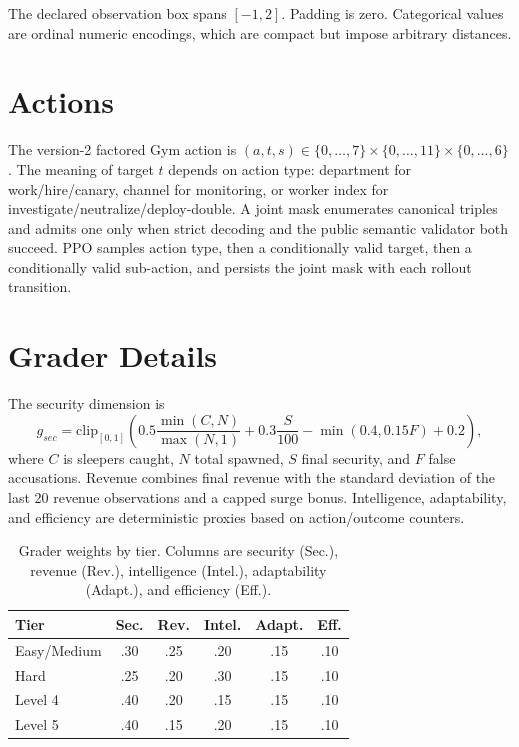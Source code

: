 The declared observation box spans $[-1,2]$. Padding is zero. Categorical values are ordinal numeric encodings, which are compact but impose arbitrary distances.

\section{Actions}

The version-2 factored Gym action is $(a,t,s) \in \{0,\ldots,7\}\times\{0,\ldots,11\}\times\{0,\ldots,6\}$. The meaning of target $t$ depends on action type: department for work/hire/canary, channel for monitoring, or worker index for investigate/neutralize/deploy-double. A joint mask enumerates canonical triples and admits one only when strict decoding and the public semantic validator both succeed. PPO samples action type, then a conditionally valid target, then a conditionally valid sub-action, and persists the joint mask with each rollout transition.

\section{Grader Details}

The security dimension is
\[
g_{sec}=\mathrm{clip}_{[0,1]}\left(0.5\frac{\min(C,N)}{\max(N,1)}+0.3\frac{S}{100}-\min(0.4,0.15F)+0.2\right),
\]
where $C$ is sleepers caught, $N$ total spawned, $S$ final security, and $F$ false accusations. Revenue combines final revenue with the standard deviation of the last 20 revenue observations and a capped surge bonus. Intelligence, adaptability, and efficiency are deterministic proxies based on action/outcome counters.

\begin{table}[h]
\centering
\caption{Grader weights by tier. Columns are security (Sec.), revenue (Rev.), intelligence (Intel.), adaptability (Adapt.), and efficiency (Eff.).}
\begin{tabular}{lccccc}
\toprule
Tier & Sec. & Rev. & Intel. & Adapt. & Eff. \\
\midrule
Easy/Medium & .30 & .25 & .20 & .15 & .10 \\
Hard & .25 & .20 & .30 & .15 & .10 \\
Level 4 & .40 & .20 & .15 & .15 & .10 \\
Level 5 & .40 & .15 & .20 & .15 & .10 \\
\bottomrule
\end{tabular}
\end{table}

